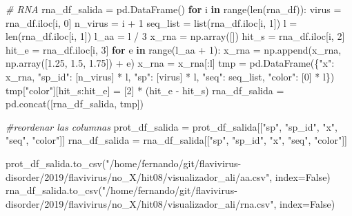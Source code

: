 \documentclass[11pt]{article}
\newenvironment{Shaded}{}{}
\newcommand{\KeywordTok}[1]{\textcolor[rgb]{0.00,0.44,0.13}{\textbf{{#1}}}}
\newcommand{\DecValTok}[1]{\textcolor[rgb]{0.25,0.63,0.44}{{#1}}}
\newcommand{\FloatTok}[1]{\textcolor[rgb]{0.25,0.63,0.44}{{#1}}}
\newcommand{\StringTok}[1]{\textcolor[rgb]{0.25,0.44,0.63}{{#1}}}
\newcommand{\CommentTok}[1]{\textcolor[rgb]{0.38,0.63,0.69}{\textit{{#1}}}}
\newcommand{\NormalTok}[1]{{#1}}
\newcommand{\VariableTok}[1]{\textcolor[rgb]{0.10,0.09,0.49}{{#1}}}
\newcommand{\ControlFlowTok}[1]{\textcolor[rgb]{0.00,0.44,0.13}{\textbf{{#1}}}}
\newcommand{\OperatorTok}[1]{\textcolor[rgb]{0.40,0.40,0.40}{{#1}}}
\newcommand{\BuiltInTok}[1]{{#1}}
\begin{document}
\begin{Shaded}
\begin{Highlighting}[]
\CommentTok{# RNA}
\NormalTok{rna_df_salida }\OperatorTok{=}\NormalTok{ pd.DataFrame()}
\ControlFlowTok{for}\NormalTok{ i }\KeywordTok{in} \BuiltInTok{range}\NormalTok{(}\BuiltInTok{len}\NormalTok{(rna_df)):}
\NormalTok{    virus }\OperatorTok{=}\NormalTok{ rna_df.iloc[i, }\DecValTok{0}\NormalTok{]}
\NormalTok{    n_virus }\OperatorTok{=}\NormalTok{ i }\OperatorTok{+} \DecValTok{1}
\NormalTok{    seq_list }\OperatorTok{=} \BuiltInTok{list}\NormalTok{(rna_df.iloc[i, }\DecValTok{1}\NormalTok{])}
\NormalTok{    l }\OperatorTok{=} \BuiltInTok{len}\NormalTok{(rna_df.iloc[i, }\DecValTok{1}\NormalTok{])}
\NormalTok{    l_aa }\OperatorTok{=}\NormalTok{ l }\OperatorTok{/} \DecValTok{3}
\NormalTok{    x_rna }\OperatorTok{=}\NormalTok{ np.array([])}
\NormalTok{    hit_s }\OperatorTok{=}\NormalTok{ rna_df.iloc[i, }\DecValTok{2}\NormalTok{]}
\NormalTok{    hit_e }\OperatorTok{=}\NormalTok{ rna_df.iloc[i, }\DecValTok{3}\NormalTok{]}
    \ControlFlowTok{for}\NormalTok{ e }\KeywordTok{in} \BuiltInTok{range}\NormalTok{(l_aa }\OperatorTok{+} \DecValTok{1}\NormalTok{):}
\NormalTok{        x_rna }\OperatorTok{=}\NormalTok{ np.append(x_rna, np.array([}\FloatTok{1.25}\NormalTok{, }\FloatTok{1.5}\NormalTok{, }\FloatTok{1.75}\NormalTok{]) }\OperatorTok{+}\NormalTok{ e)}
\NormalTok{    x_rna }\OperatorTok{=}\NormalTok{ x_rna[:l]}
\NormalTok{    tmp }\OperatorTok{=}\NormalTok{ pd.DataFrame(\{}\StringTok{"x"}\NormalTok{: x_rna, }\StringTok{"sp_id"}\NormalTok{: [n_virus] }\OperatorTok{*}\NormalTok{ l, }\StringTok{"sp"}\NormalTok{: [virus] }\OperatorTok{*}\NormalTok{ l, }\StringTok{"seq"}\NormalTok{: seq_list, }\StringTok{"color"}\NormalTok{: [}\DecValTok{0}\NormalTok{] }\OperatorTok{*}\NormalTok{ l\})}
\NormalTok{    tmp[}\StringTok{"color"}\NormalTok{][hit_s:hit_e] }\OperatorTok{=}\NormalTok{ [}\DecValTok{2}\NormalTok{] }\OperatorTok{*}\NormalTok{ (hit_e }\OperatorTok{-}\NormalTok{ hit_s)}
\NormalTok{    rna_df_salida }\OperatorTok{=}\NormalTok{ pd.concat([rna_df_salida, tmp])}

\CommentTok{#reordenar las columnas}
\NormalTok{prot_df_salida }\OperatorTok{=}\NormalTok{ prot_df_salida[[}\StringTok{"sp"}\NormalTok{, }\StringTok{"sp_id"}\NormalTok{, }\StringTok{"x"}\NormalTok{, }\StringTok{"seq"}\NormalTok{, }\StringTok{"color"}\NormalTok{]]}
\NormalTok{rna_df_salida }\OperatorTok{=}\NormalTok{ rna_df_salida[[}\StringTok{"sp"}\NormalTok{, }\StringTok{"sp_id"}\NormalTok{, }\StringTok{"x"}\NormalTok{, }\StringTok{"seq"}\NormalTok{, }\StringTok{"color"}\NormalTok{]]}

\NormalTok{prot_df_salida.to_csv(}\StringTok{"/home/fernando/git/flavivirus-disorder/2019/flavivirus/no_X/hit08/visualizador_ali/aa.csv"}\NormalTok{, index}\OperatorTok{=}\VariableTok{False}\NormalTok{)}
\NormalTok{rna_df_salida.to_csv(}\StringTok{"/home/fernando/git/flavivirus-disorder/2019/flavivirus/no_X/hit08/visualizador_ali/rna.csv"}\NormalTok{, index}\OperatorTok{=}\VariableTok{False}\NormalTok{)}
\end{Highlighting}
\end{Shaded}
\end{document}
